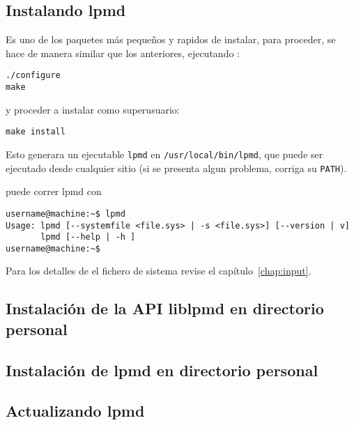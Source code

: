 \documentclass[a4paper,10pt]{scrbook}
\newcommand{\control}[1]{\begin{center}\begin{minipage}{10cm}\texttt{#1}\end{minipage}\end{center}}
\begin{document}
\subsection{Instalando lpmd}

Es uno de los paquetes m\'as peque\~nos y rapidos de instalar, para proceder, se hace de manera similar que los anteriores, ejecutando :

\control{./configure \\ make}

y proceder a instalar como superusuario:

\control{make install}

Esto generara un ejecutable \verb|lpmd| en \verb|/usr/local/bin/lpmd|, que puede ser ejecutado desde cualquier sitio (si se presenta algun problema, corriga su \verb|PATH|).

puede correr lpmd con

\begin{verbatim}
username@machine:~$ lpmd
Usage: lpmd [--systemfile <file.sys> | -s <file.sys>] [--version | v]
       lpmd [--help | -h ]
username@machine:~$
\end{verbatim}

Para los detalles de el fichero de sistema revise el cap\'itulo~\ref{chap:input}.

\subsection{Instalaci\'on de la API liblpmd en directorio personal}

\subsection{Instalaci\'on de lpmd en directorio personal}

\subsection{Actualizando lpmd}
\end{document}
